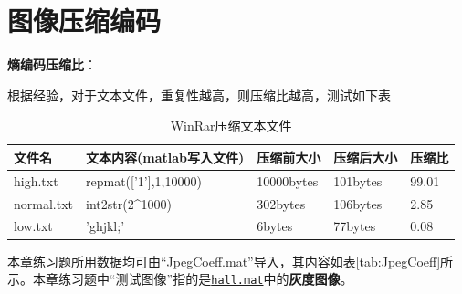 \documentclass{article}
\numberwithin{figure}{section}
\numberwithin{table}{section}
\numberwithin{listing}{section}
\numberwithin{equation}{section}
\begin{document}

    \section{图像压缩编码} %
    \label{sec:图像压缩编码}

        \textbf{熵编码压缩比}：

        根据经验，对于文本文件，重复性越高，则压缩比越高，测试如下表

        \begin{table}[H]
            \caption{WinRar压缩文本文件}
            \label{tab:winrar}
            \centering
        
            \ttfamily
            \begin{tabular}{l|l|l|l|l}
            \hline
        
            \hline
            \textbf{文件名} & \textbf{文本内容(matlab写入文件)} & \textbf{压缩前大小} & \textbf{压缩后大小} & \textbf{压缩比} \\
            \hline
                high.txt & repmat(['1'],1,10000) & 10000bytes & 101bytes & 99.01 \\
            \hline
                normal.txt & int2str(2\^{}1000) & 302bytes & 106bytes & 2.85 \\
            \hline
                low.txt & 'ghjkl;' & 6bytes & 77bytes & 0.08 \\
        
            \hline
            \end{tabular}
        \end{table}

        本章练习题所用数据均可由“JpegCoeff.mat”导入，其内容如表\ref{tab:JpegCoeff}所示。本章练习题中“测试图像”指的是\href{run:../resource/hall.mat}{\texttt{hall.mat}}中的\textbf{灰度图像}。
\end{document}
